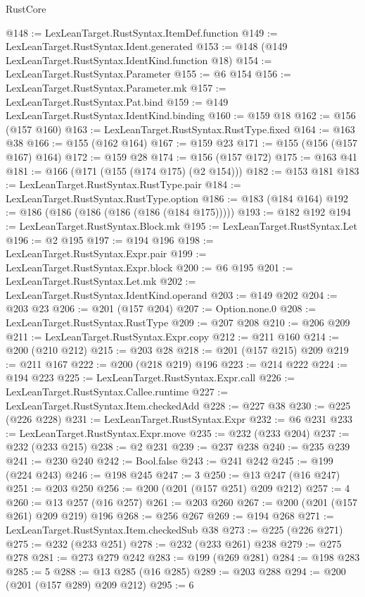\begin{lexlean}{RustCore}
\begin{coremodule}
{\begin{coremodule}
{{{{{@148 := LexLeanTarget.RustSyntax.ItemDef.function
@149 := LexLeanTarget.RustSyntax.Ident.generated
@153 := @148 (@149 LexLeanTarget.RustSyntax.IdentKind.function @18)
@154 := LexLeanTarget.RustSyntax.Parameter
@155 := @6 @154
@156 := LexLeanTarget.RustSyntax.Parameter.mk
@157 := LexLeanTarget.RustSyntax.Pat.bind
@159 := @149 LexLeanTarget.RustSyntax.IdentKind.binding
@160 := @159 @18
@162 := @156 (@157 @160)
@163 := LexLeanTarget.RustSyntax.RustType.fixed
@164 := @163 @38
@166 := @155 (@162 @164)
@167 := @159 @23
@171 := @155 (@156 (@157 @167) @164)
@172 := @159 @28
@174 := @156 (@157 @172)
@175 := @163 @41
@181 := @166 (@171 (@155 (@174 @175) (@2 @154)))
@182 := @153 @181
@183 := LexLeanTarget.RustSyntax.RustType.pair
@184 := LexLeanTarget.RustSyntax.RustType.option
@186 := @183 (@184 @164)
@192 := @186 (@186 (@186 (@186 (@186 (@184 @175)))))
@193 := @182 @192
@194 := LexLeanTarget.RustSyntax.Block.mk
@195 := LexLeanTarget.RustSyntax.Let
@196 := @2 @195
@197 := @194 @196
@198 := LexLeanTarget.RustSyntax.Expr.pair
@199 := LexLeanTarget.RustSyntax.Expr.block
@200 := @6 @195
@201 := LexLeanTarget.RustSyntax.Let.mk
@202 := LexLeanTarget.RustSyntax.IdentKind.operand
@203 := @149 @202
@204 := @203 @23
@206 := @201 (@157 @204)
@207 := Option.none.{0}
@208 := LexLeanTarget.RustSyntax.RustType
@209 := @207 @208
@210 := @206 @209
@211 := LexLeanTarget.RustSyntax.Expr.copy
@212 := @211 @160
@214 := @200 (@210 @212)
@215 := @203 @28
@218 := @201 (@157 @215) @209
@219 := @211 @167
@222 := @200 (@218 @219) @196
@223 := @214 @222
@224 := @194 @223
@225 := LexLeanTarget.RustSyntax.Expr.call
@226 := LexLeanTarget.RustSyntax.Callee.runtime
@227 := LexLeanTarget.RustSyntax.Item.checkedAdd
@228 := @227 @38
@230 := @225 (@226 @228)
@231 := LexLeanTarget.RustSyntax.Expr
@232 := @6 @231
@233 := LexLeanTarget.RustSyntax.Expr.move
@235 := @232 (@233 @204)
@237 := @232 (@233 @215)
@238 := @2 @231
@239 := @237 @238
@240 := @235 @239
@241 := @230 @240
@242 := Bool.false
@243 := @241 @242
@245 := @199 (@224 @243)
@246 := @198 @245
@247 := 3
@250 := @13 @247 (@16 @247)
@251 := @203 @250
@256 := @200 (@201 (@157 @251) @209 @212)
@257 := 4
@260 := @13 @257 (@16 @257)
@261 := @203 @260
@267 := @200 (@201 (@157 @261) @209 @219) @196
@268 := @256 @267
@269 := @194 @268
@271 := LexLeanTarget.RustSyntax.Item.checkedSub @38
@273 := @225 (@226 @271)
@275 := @232 (@233 @251)
@278 := @232 (@233 @261) @238
@279 := @275 @278
@281 := @273 @279 @242
@283 := @199 (@269 @281)
@284 := @198 @283
@285 := 5
@288 := @13 @285 (@16 @285)
@289 := @203 @288
@294 := @200 (@201 (@157 @289) @209 @212)
@295 := 6
}}}}}
\end{coremodule}}
\end{coremodule}
\end{lexlean}
